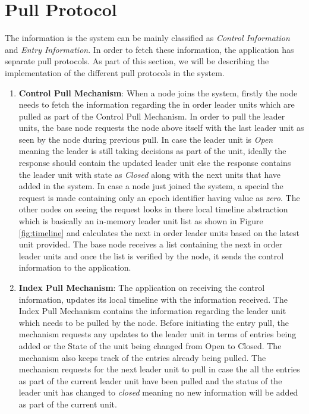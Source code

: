 \documentclass[a4paper,11pt]{kth-mag}
\begin{document}
\section{Pull Protocol}

The information is the system can be mainly classified as \textit{Control Information} and \textit{Entry Information}. In order to fetch these information, the application has separate pull protocols. As part of this section, we will be describing the implementation of the different pull protocols in the system.


\begin{enumerate}

\item \textbf{Control Pull Mechanism}: When a node joins the system, firstly the node needs to fetch the information regarding the in order leader units which are pulled as part of the Control Pull Mechanism. In order to pull the leader units, the base node requests the node above itself with the last leader unit as seen by the node during previous pull. In case the leader unit is \textit{Open} meaning the leader is still taking decisions as part of the unit, ideally the response should contain the updated leader unit else the response contains the leader unit with state as \textit{Closed} along with the next units that have added in the system. In case a node just joined the system, a special the request is made containing only an epoch identifier having value as \textit{zero}. The other nodes on seeing the request looks in there local timeline abstraction which is basically an in-memory leader unit list as shown in Figure \ref{fig:timeline} and calculates the next in order leader units based on the latest unit provided. The base node receives a list containing the next in order leader units and once the list is verified by the node, it sends the control information to the application.

\item \textbf{Index Pull Mechanism}: The application on receiving the control information, updates its local timeline with the information received. The Index Pull Mechanism contains the information regarding the leader unit which needs to be pulled by the node. Before initiating the entry pull, the mechanism requests any updates to the leader unit in terms of entries being added or the State of the unit being changed from Open to Closed. The mechanism also keeps track of the entries already being pulled. The mechanism requests for the next leader unit to pull in case the all the entries as part of the current leader unit have been pulled and the status of the leader unit has changed to \textit{closed} meaning no new information will be added as part of the current unit.

\end{enumerate}
\end{document}
